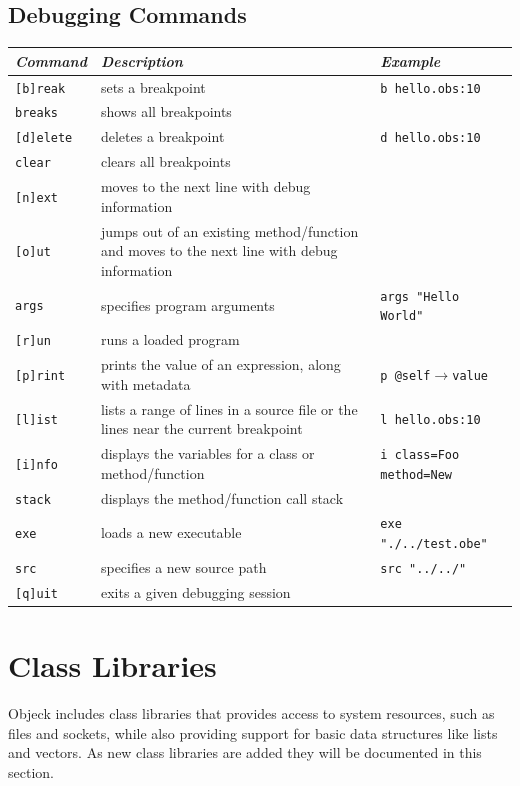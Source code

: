 \documentclass[12pt]{article}
\begin{document}
\subsection{Debugging Commands}
\begin{center}
\begin{tabular}{| l |p{4 cm} |p{6 cm} |}
\hline
\emph{Command} & \emph{Description} & \emph{Example} \\ \hline \hline
\texttt{[b]reak} &  sets a breakpoint & \texttt{b hello.obs:10} \\ \hline
\texttt{breaks} &  shows all breakpoints &  \\ \hline
\texttt{[d]elete} &  deletes a breakpoint & \texttt{d hello.obs:10} \\ \hline
\texttt{clear} &  clears all breakpoints &  \\ \hline
\texttt{[n]ext} &  moves to the next line with debug information &  \\ \hline
\texttt{[o]ut} &  jumps out of an existing method/function and moves to the next line with debug information &  \\ \hline
\texttt{args} &  specifies program arguments & \texttt{args "Hello World"} \\ \hline
\texttt{[r]un} &  runs a loaded program &  \\ \hline
\texttt{[p]rint} &  prints the value of an expression, along with metadata & \texttt{p @self$\rightarrow$value} \\ \hline
\texttt{[l]ist} &  lists a range of lines in a source file or the lines near the current breakpoint & \texttt{l hello.obs:10} \\ \hline
\texttt{[i]nfo} &  displays the variables for a class or method/function & \texttt{i class=Foo method=New} \\ \hline
\texttt{stack} &  displays the method/function call stack &  \\ \hline
\texttt{exe} &  loads a new executable & \texttt{exe "./../test.obe"} \\ \hline
\texttt{src} &  specifies a new source path & \texttt{src "../../"} \\ \hline
\texttt{[q]uit} &  exits a given debugging session &  \\ \hline
\end{tabular}
\end{center}

\section{Class Libraries}
Objeck includes class libraries that provides access to system resources, such as files and sockets, while also providing support for  basic data structures like lists and vectors.  As new class libraries are added they will be documented in this section.
\end{document}
